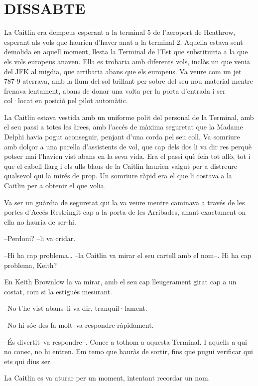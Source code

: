 \chapter*{DISSABTE}

La Caitlin era dempeus esperant a la terminal 5 de l'aeroport de
Heathrow, esperant als vols que haurien d'haver anat a la terminal 2.
Aquella estava sent demolida en aquell moment, llesta la Terminal de
l'Est que substituiria a la que els vols europeus anaven. Ella es
trobaria amb diferents vols, inclòs un que venia del JFK al migdia, que
arribaria abans que els europeus. Va veure com un jet 787-9 aterrava,
amb la llum del sol brillant per sobre del seu nou material mentre
frenava lentament, abans de donar una volta per la porta d'entrada i ser
col·locat en posició pel pilot automàtic.

La Caitlin estava vestida amb un uniforme polit del personal de la
Terminal, amb el seu passi a totes les àrees, amb l'accés de màxima
seguretat que la Madame Delphi havia pogut aconseguir, penjant d'una
corda pel seu coll. Va somriure amb dolçor a una parella d'assistents de
vol, que cap dels dos li va dir res perquè potser mai l'havien vist
abans en la seva vida. Era el passi què feia tot allò, tot i que el
cabell llarg i els ulls blaus de la Caitlin haurien valgut per a
distreure qualsevol qui la mirés de prop. Un somriure ràpid era el que
li costava a la Caitlin per a obtenir el que volia.

Va ser un guàrdia de seguretat qui la va veure mentre caminava a través
de les portes d'Accés Restringit cap a la porta de les Arribades, anant
exactament on ella no hauria de ser-hi.

--Perdoni? --li va cridar.

--Hi ha cap problema\ldots{} --la Caitlin va mirar el seu cartell amb el
nom--. Hi ha cap problema, Keith?

En Keith Brownlow la va mirar, amb el seu cap lleugerament girat cap a
un costat, com si la estigués mesurant.

--No t'he vist abans--li va dir, tranquil·lament.

--No hi sóc des fa molt--va respondre ràpidament.

--És divertit--va respondre--. Conec a tothom a aquesta Terminal. I
aquells a qui no conec, no hi entren. Em temo que hauràs de sortir, fins
que pugui verificar qui ets qui dius ser.

La Caitlin es va aturar per un moment, intentant recordar un nom.

